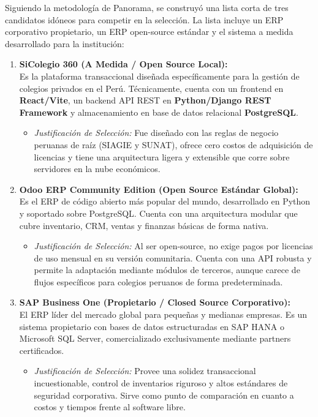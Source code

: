 \documentclass[12pt,a4paper,oneside]{report}
\begin{document}
Siguiendo la metodología de Panorama, se construyó una lista corta de tres candidatos idóneos para competir en la selección. La lista incluye un ERP corporativo propietario, un ERP open-source estándar y el sistema a medida desarrollado para la institución:

\begin{enumerate}
    \item \textbf{SiColegio 360 (A Medida / Open Source Local):} \\
    Es la plataforma transaccional diseñada específicamente para la gestión de colegios privados en el Perú. Técnicamente, cuenta con un frontend en \textbf{React/Vite}, un backend API REST en \textbf{Python/Django REST Framework} y almacenamiento en base de datos relacional \textbf{PostgreSQL}.
    \begin{itemize}
        \item \textit{Justificación de Selección:} Fue diseñado con las reglas de negocio peruanas de raíz (SIAGIE y SUNAT), ofrece cero costos de adquisición de licencias y tiene una arquitectura ligera y extensible que corre sobre servidores en la nube económicos.
    \end{itemize}
    
    \item \textbf{Odoo ERP Community Edition (Open Source Estándar Global):} \\
    Es el ERP de código abierto más popular del mundo, desarrollado en Python y soportado sobre PostgreSQL. Cuenta con una arquitectura modular que cubre inventario, CRM, ventas y finanzas básicas de forma nativa.
    \begin{itemize}
        \item \textit{Justificación de Selección:} Al ser open-source, no exige pagos por licencias de uso mensual en su versión comunitaria. Cuenta con una API robusta y permite la adaptación mediante módulos de terceros, aunque carece de flujos específicos para colegios peruanos de forma predeterminada.
    \end{itemize}
    
    \item \textbf{SAP Business One (Propietario / Closed Source Corporativo):} \\
    El ERP líder del mercado global para pequeñas y medianas empresas. Es un sistema propietario con bases de datos estructuradas en SAP HANA o Microsoft SQL Server, comercializado exclusivamente mediante partners certificados.
    \begin{itemize}
        \item \textit{Justificación de Selección:} Provee una solidez transaccional incuestionable, control de inventarios riguroso y altos estándares de seguridad corporativa. Sirve como punto de comparación en cuanto a costos y tiempos frente al software libre.
    \end{itemize}
\end{enumerate}
\end{document}
